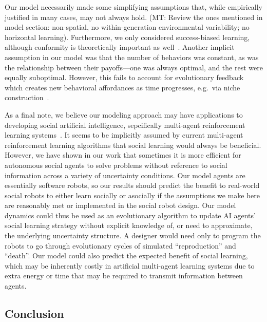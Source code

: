 \documentclass[letterpaper,11.5pt]{scrartcl}
\newcommand{\mt}[1]{{\textcolor{myorange} {({\tiny MT:} #1)}}}
\begin{document}
Our model necessarily made some simplifying assumptions that, while
empirically justified in many cases, may not always hold.
\mt{Review the ones mentioned in model section: non-spatial, no within-generation
environmental variability; no horizontal learning}.
Furthermore, we only considered
success-biased learning, although conformity is theoretically important as
well~\cite{Muthukrishna2016a,Smaldino2018b}. Another implicit assumption
in our model was that the number of behaviors was constant, as was the relationship
between their payoffs---one was always optimal, and the rest were equally
suboptimal. However, this fails to account for evolutionary feedback which creates
new behavioral affordances as time progresses, e.g.\ via niche 
construction~\cite{Smaldino2012,Heras-Escribano2020}.

As a final note, we believe 
our modeling approach may have applications to developing social artificial
intelligence, sepcifically multi-agent reinforcement learning
systems~\cite{Sandholm1996,Ndousse2021,Gronauer2022,Jaques2019}.
It seems to be implicitly assumed by current multi-agent reinforcement learning
algorithms that social learning
would always be beneficial. However, we have shown in our work that sometimes 
it is more efficient for autonomous social agents to solve problems without
reference to social information across a variety of uncertainty conditions. 
Our model agents are essentially software
robots, so our results should predict the benefit to real-world social robots
to either learn socially or asocially if the assumptions we make here are 
reasonably met or implemented in the social robot design.
Our model dynamics could thus be used as an
evolutionary algorithm to update AI agents' social learning strategy without
explicit knowledge of, or need to approximate, the underlying uncertainty structure.
A designer would need only to program the robots to go through evolutionary
cycles of simulated ``reproduction'' and ``death''.
Our model could also predict the expected benefit of social learning, which may be
inherently costly in artificial multi-agent learning systems due to extra
energy or time that may be required to transmit information between agents.


\subsection{Conclusion}
\end{document}

